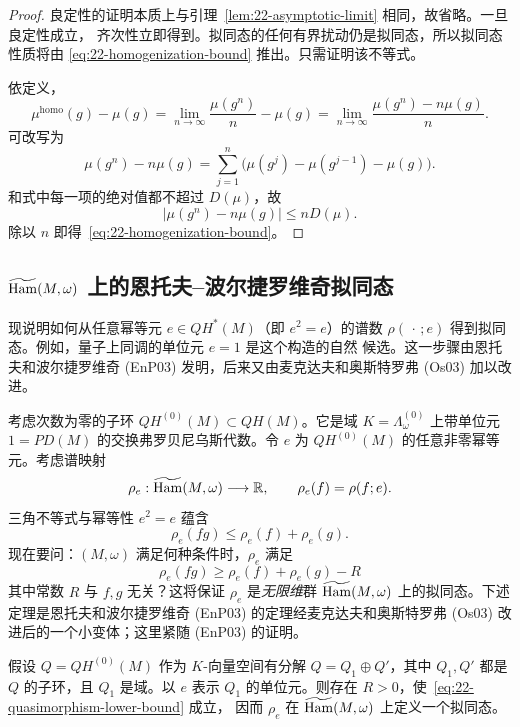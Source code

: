 \begin{proof}
良定性的证明本质上与引理~\ref{lem:22-asymptotic-limit} 相同，故省略。一旦良定性成立，
齐次性立即得到。拟同态的任何有界扰动仍是拟同态，所以拟同态性质将由
\eqref{eq:22-homogenization-bound} 推出。只需证明该不等式。

依定义，
\[
 \mu^{\mathrm{homo}}(g)-\mu(g)
 =\lim_{n\to\infty}\frac{\mu(g^n)}n-\mu(g)
 =\lim_{n\to\infty}\frac{\mu(g^n)-n\mu(g)}n.
\]
可改写为
\[
 \mu(g^n)-n\mu(g)
 =\sum_{j=1}^n\bigl(\mu(g^j)-\mu(g^{j-1})-\mu(g)\bigr).
\]
和式中每一项的绝对值都不超过 $D(\mu)$，故
\[
 |\mu(g^n)-n\mu(g)|\leq nD(\mu).
\]
除以 $n$ 即得~\eqref{eq:22-homogenization-bound}。
\end{proof}
\subsection{\texorpdfstring{$\widetilde{\operatorname{Ham}}(M,\omega)$}{Ham(M,omega) 的万有覆盖}
上的恩托夫--波尔捷罗维奇拟同态}

现说明如何从任意幂等元 $e\in QH^*(M)$（即 $e^2=e$）的谱数
$\rho(\,\cdot\,;e)$ 得到拟同态。例如，量子上同调的单位元 $e=1$ 是这个构造的自然
候选。这一步骤由恩托夫和波尔捷罗维奇 (EnP03) 发明，后来又由麦克达夫和奥斯特罗弗
(Os03) 加以改进。

考虑次数为零的子环 $QH^{(0)}(M)\subset QH(M)$。它是域
$K=\Lambda_\omega^{(0)}$ 上带单位元 $1=PD(M)$ 的交换弗罗贝尼乌斯代数。令 $e$ 为
$QH^{(0)}(M)$ 的任意非零幂等元。考虑谱映射
\[
 \rho_e:\widetilde{\operatorname{Ham}}(M,\omega)\longrightarrow\mathbb R,
 \qquad \rho_e(f)=\rho(f;e).
\]
三角不等式与幂等性 $e^2=e$ 蕴含
\[
 \rho_e(fg)\leq\rho_e(f)+\rho_e(g).
\]
现在要问：$(M,\omega)$ 满足何种条件时，$\rho_e$ 满足
\begin{equation}
 \rho_e(fg)\geq\rho_e(f)+\rho_e(g)-R
 \label{eq:22-quasimorphism-lower-bound}
\end{equation}
其中常数 $R$ 与 $f,g$ 无关？这将保证 $\rho_e$ 是\emph{无限维}群
$\widetilde{\operatorname{Ham}}(M,\omega)$ 上的拟同态。下述定理是恩托夫和波尔捷罗维奇
(EnP03) 的定理经麦克达夫和奥斯特罗弗 (Os03) 改进后的一个小变体；这里紧随
(EnP03) 的证明。

\begin{theorem}[(EnP03)]
\label{thm:22-entov-polterovich-quasimorphism}
假设 $Q=QH^{(0)}(M)$ 作为 $K$-向量空间有分解
$Q=Q_1\oplus Q'$，其中 $Q_1,Q'$ 都是 $Q$ 的子环，且 $Q_1$ 是域。以 $e$ 表示
$Q_1$ 的单位元。则存在 $R>0$，使~\eqref{eq:22-quasimorphism-lower-bound} 成立，
因而 $\rho_e$ 在 $\widetilde{\operatorname{Ham}}(M,\omega)$ 上定义一个拟同态。
\end{theorem}

